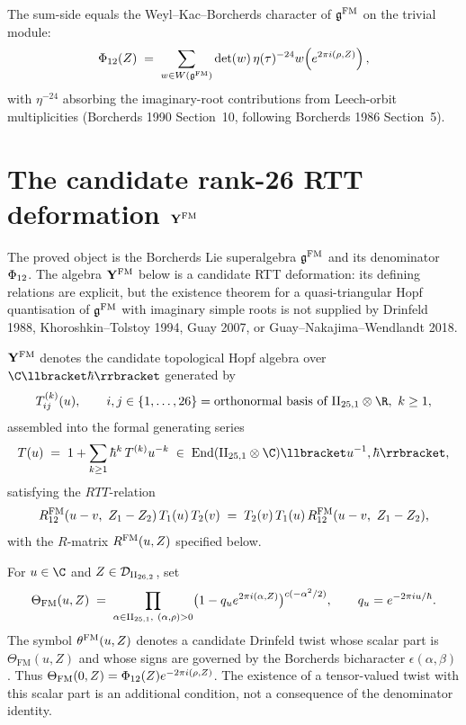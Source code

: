 The sum-side equals the Weyl--Kac--Borcherds character of $\mathfrak{g}^{\mathrm{FM}}$ on the trivial module:
\[
 \Phi_{12}(Z) \;=\; \sum_{w\in W(\mathfrak{g}^{\mathrm{FM}})} \det(w)\, \eta(\tau)^{-24} w\!\left(e^{2\pi i(\rho, Z)}\right),
\]
with $\eta^{-24}$ absorbing the imaginary-root contributions from Leech-orbit multiplicities (Borcherds 1990 Section~10, following Borcherds 1986 Section~5).

\section{The candidate rank-26 RTT deformation \texorpdfstring{$\mathbf{Y}^{\mathrm{FM}}$}{YFM}}
\label{sec:fm-yfm}

The proved object is the Borcherds Lie superalgebra $\mathfrak{g}^{\mathrm{FM}}$ and its denominator $\Phi_{12}$. The algebra $\mathbf{Y}^{\mathrm{FM}}$ below is a candidate RTT deformation: its defining relations are explicit, but the existence theorem for a quasi-triangular Hopf quantisation of $\mathfrak{g}^{\mathrm{FM}}$ with imaginary simple roots is not supplied by Drinfeld 1988, Khoroshkin--Tolstoy 1994, Guay 2007, or Guay--Nakajima--Wendlandt 2018.

\begin{definition}
\label{def:fm-yangian}
$\mathbf{Y}^{\mathrm{FM}}$ denotes the candidate topological Hopf algebra over $\C\llbracket\hbar\rrbracket$ generated by
\[
 T^{(k)}_{ij}(u), \qquad i,j\in\{1,\ldots,26\} = \text{orthonormal basis of }\IIlor\otimes\R,\ k\geq 1,
\]
assembled into the formal generating series
\[
 T(u) \;=\; 1 + \sum_{k\geq 1} \hbar^k\, T^{(k)} u^{-k} \;\in\; \mathrm{End}(\IIlor\otimes\C)\llbracket u^{-1}, \hbar\rrbracket,
\]
satisfying the $RTT$-relation
\[
 R^{\mathrm{FM}}_{12}(u - v,\ Z_1 - Z_2)\, T_1(u)\, T_2(v) \;=\; T_2(v)\, T_1(u)\, R^{\mathrm{FM}}_{12}(u - v,\ Z_1 - Z_2),
\]
with the $R$-matrix $R^{\mathrm{FM}}(u,Z)$ specified below.
\end{definition}

\begin{definition}
\label{def:fm-theta-cocycle}
For $u\in\C$ and $Z\in\mathcal{D}_{\mathrm{II}_{26,2}}$, set
\[
 \Theta_{\mathrm{FM}}(u,Z)
 \;=\;
 \prod_{\alpha\in\mathrm{II}_{25,1},\ (\alpha,\rho)>0}
 \bigl(1-q_u e^{2\pi i(\alpha,Z)}\bigr)^{c(-\alpha^2/2)},
 \qquad q_u=e^{-2\pi iu/\hbar}.
\]
The symbol $\theta^{\mathrm{FM}}(u,Z)$ denotes a candidate Drinfeld twist whose scalar
part is $\Theta_{\mathrm{FM}}(u,Z)$ and whose signs are governed by the
Borcherds bicharacter $\epsilon(\alpha,\beta)$. Thus
$\Theta_{\mathrm{FM}}(0,Z)=\Phi_{12}(Z)e^{-2\pi i(\rho,Z)}$. The existence
of a tensor-valued twist with this scalar part is an additional
condition, not a consequence of the denominator identity.
\end{definition}

